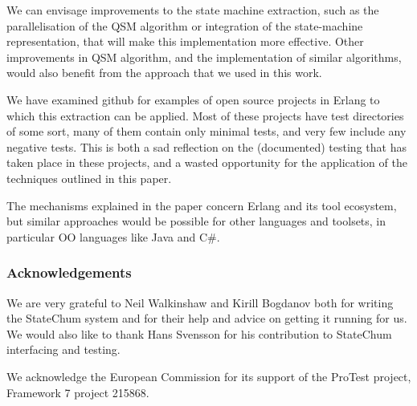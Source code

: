 \documentclass[]{sigplanconf}
\begin{document}
We can envisage improvements to the state machine extraction, such as the  parallelisation of the QSM
algorithm or integration of the state-machine representation, that
will make this implementation more effective. Other improvements
in QSM algorithm, and the implementation of similar algorithms,
would also benefit from the approach that we
used in this work.

We have examined github for examples of open source projects in Erlang to which this extraction can be applied. Most of these projects have test directories of some sort, many of them contain only minimal tests, and very few include any negative tests. This is both a sad reflection on the (documented) testing that has taken place in these projects, and a wasted opportunity for the application of the techniques outlined in this paper.

The mechanisms explained in the paper concern Erlang and its tool ecosystem, but similar approaches would be possible for other languages and toolsets, in particular OO languages like Java and C\#.


\subsubsection*{Acknowledgements}
We are very grateful to Neil Walkinshaw and Kirill Bogdanov both for writing the StateChum system and for their help and advice on getting it running for us. We would also like to thank Hans Svensson for his contribution to StateChum interfacing and testing. 

We acknowledge the European Commission for its support of the ProTest project, Framework 7 project 215868. 



{}

\end{document}
